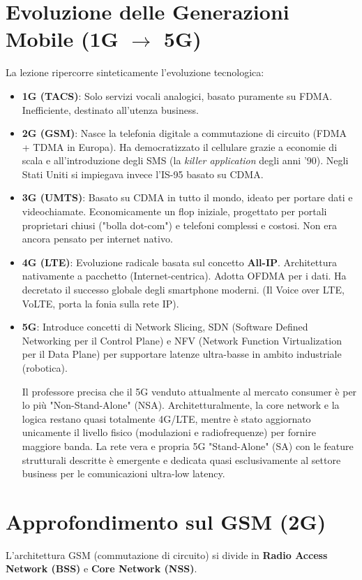 \section{Evoluzione delle Generazioni Mobile (1G $\rightarrow$ 5G)}
La lezione ripercorre sinteticamente l'evoluzione tecnologica:
\begin{itemize}
    \item \textbf{1G (TACS)}: Solo servizi vocali analogici, basato puramente su FDMA. Inefficiente, destinato all'utenza business.
    \item \textbf{2G (GSM)}: Nasce la telefonia digitale a commutazione di circuito (FDMA + TDMA in Europa). Ha democratizzato il cellulare grazie a economie di scala e all'introduzione degli SMS (la \textit{killer application} degli anni '90). Negli Stati Uniti si impiegava invece l'IS-95 basato su CDMA.
    \item \textbf{3G (UMTS)}: Basato su CDMA in tutto il mondo, ideato per portare dati e videochiamate. Economicamente un flop iniziale, progettato per portali proprietari chiusi ("bolla dot-com") e telefoni complessi e costosi. Non era ancora pensato per internet nativo.
    \item \textbf{4G (LTE)}: Evoluzione radicale basata sul concetto \textbf{All-IP}. Architettura nativamente a pacchetto (Internet-centrica). Adotta OFDMA per i dati. Ha decretato il successo globale degli smartphone moderni. (Il Voice over LTE, VoLTE, porta la fonia sulla rete IP).
    \item \textbf{5G}: Introduce concetti di Network Slicing, SDN (Software Defined Networking per il Control Plane) e NFV (Network Function Virtualization per il Data Plane) per supportare latenze ultra-basse in ambito industriale (robotica). 
    \begin{remark}
    Il professore precisa che il 5G venduto attualmente al mercato consumer è per lo più "Non-Stand-Alone" (NSA). Architetturalmente, la core network e la logica restano quasi totalmente 4G/LTE, mentre è stato aggiornato unicamente il livello fisico (modulazioni e radiofrequenze) per fornire maggiore banda. La rete vera e propria 5G "Stand-Alone" (SA) con le feature strutturali descritte è emergente e dedicata quasi esclusivamente al settore business per le comunicazioni ultra-low latency.
    \end{remark}
\end{itemize}

\section{Approfondimento sul GSM (2G)}
L'architettura GSM (commutazione di circuito) si divide in \textbf{Radio Access Network (BSS)} e \textbf{Core Network (NSS)}.

